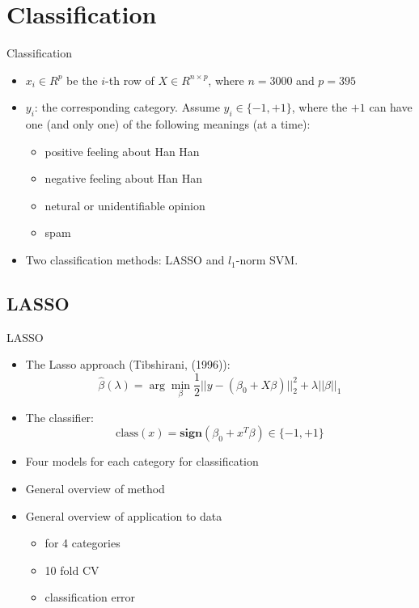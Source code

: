 \documentclass[12pt]{beamer}
\newcommand{\1}[1]{{\mathbf 1}\left\{#1\right\}}        %
\begin{document}
\clearpage 
\section{Classification}

\begin{frame}{Classification}


\begin{itemize}[<+->]


\item $x_i\in R^{p}$ be the $i$-th row of $X\in R^{n\times p}$, where $n=3000$ and $p=395$
\item $y_i$: the corresponding category. Assume $y_i\in\{-1,+1\}$, where the $+1$ can have one (and only one) of the following meanings (at a time):
  \begin{itemize}[<+->]
    \item positive feeling about Han Han
    \item negative feeling about Han Han 
    \item netural or unidentifiable opinion 
    \item spam
\end{itemize}
\item Two classification methods: LASSO and $l_1$-norm SVM.
\end{itemize}
\end{frame}
\subsection{LASSO}

\begin{frame}[fragile]{LASSO}
\begin{itemize}[<+->]

\item The Lasso approach (Tibshirani, (1996)):
\[
\hat{\beta}(\lambda) = \arg \min_\beta \frac{1}{2}||y-(\beta_0+X\beta)||_2^2 + \lambda ||\beta||_1
\]
\item The classifier:
\[
\text{class}(x) = \textbf{sign}(\beta_0+x^T\beta)\in\{-1,+1\}
\]

\item Four models for each category for classification
\item General overview of method
\item General overview of application to data
	\begin{itemize}
	\item for 4 categories
	\item 10 fold CV
	\item classification error
	\end{itemize}
	
\end{itemize}

\end{frame}
\end{document}
